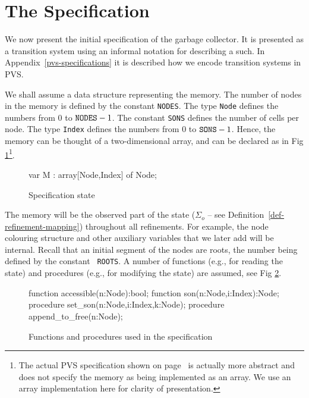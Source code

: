 
\section{The Specification}
\label{goto-specification}

We now present  the initial  specification of  the  garbage
collector.  It is  presented as a  transition  system using an informal
notation for  describing a such.   In Appendix~\ref{pvs-specifications}
it is described how we encode transition systems in PVS.

We shall assume a data  structure representing the memory.  The number
of  nodes in the  memory is defined by the  constant {\tt NODES}\@.  The
type {\tt Node} defines the numbers from $0$ to ${\tt NODES} - 1$.  The
constant {\tt  SONS} defines the number  of  cells per node.  The type
{\tt Index} defines the numbers  from $0$ to ${\tt  SONS} - 1$. Hence,
the  memory can  be  thought of a   two-dimensional array, and can  be
declared as in Fig \ref{spec-state}\footnote{The actual PVS specification shown on
page~\pageref{memory-fig} is actually more abstract and does not
specify the memory as being implemented as an array.  We use
an array implementation here for clarity of presentation. }.

\begin{figure}[htb]
\begin{smallsession}
  var M : array[Node,Index] of Node;
\end{smallsession}
\caption{Specification state}
\label{spec-state}
\end{figure}

The memory will be the observed part  of the state ($\Sigma_{o}$ -- see
Definition~\ref{def-refinement-mapping}) throughout all  refinements. 
For example, the node  colouring  structure and other  auxiliary variables
that we later add will be internal.  Recall that an initial segment of
the  nodes are roots, the  number  being defined by  the constant {\tt
  ROOTS}\@.   A number of functions  (e.g., for reading the  state) and
procedures (e.g., for modifying  the  state) are assumed, see Fig \ref{spec-functions}.

\begin{figure}[htb]
\begin{smallsession}
  function  accessible(n:Node):bool;
  function  son(n:Node,i:Index):Node;
  procedure set_son(n:Node,i:Index,k:Node);
  procedure append_to_free(n:Node);
\end{smallsession}
\caption{Functions and procedures used in the specification}
\label{spec-functions}
\end{figure}

